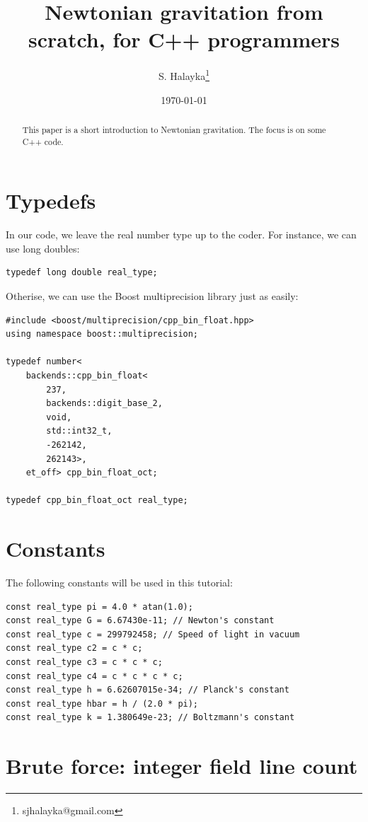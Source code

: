 \documentclass[12pt]{article}
\title{Newtonian gravitation from scratch, for C++ programmers}
\author{S. Halayka\footnote{sjhalayka@gmail.com}}
\date{\today\;\currenttime}
\begin{document}
 
\maketitle

\begin{abstract}
This paper is a short introduction to Newtonian gravitation.
The focus is on some C++ code.
\end{abstract}



\section{Typedefs}
In our code, we leave the real number type up to the coder.
For instance, we can use long doubles:
\begin{lstlisting}
typedef long double real_type;
\end{lstlisting}
Otherise, we can use the Boost multiprecision library just as easily:
\begin{lstlisting}
#include <boost/multiprecision/cpp_bin_float.hpp>
using namespace boost::multiprecision;

typedef number<
	backends::cpp_bin_float<
		237, 
		backends::digit_base_2, 
		void, 
		std::int32_t, 
		-262142, 
		262143>, 
	et_off> cpp_bin_float_oct;

typedef cpp_bin_float_oct real_type;
\end{lstlisting}




\section{Constants}

The following constants will be used in this tutorial:
\begin{lstlisting}
const real_type pi = 4.0 * atan(1.0);
const real_type G = 6.67430e-11; // Newton's constant
const real_type c = 299792458; // Speed of light in vacuum
const real_type c2 = c * c;
const real_type c3 = c * c * c;
const real_type c4 = c * c * c * c;
const real_type h = 6.62607015e-34; // Planck's constant
const real_type hbar = h / (2.0 * pi);
const real_type k = 1.380649e-23; // Boltzmann's constant
\end{lstlisting}






\section{Brute force: integer field line count}
\end{document}

